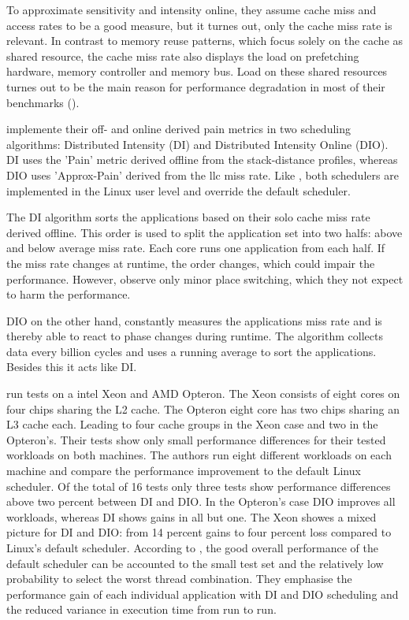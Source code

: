 To approximate sensitivity and intensity online, they assume cache miss and
access rates to be a good measure, but it turnes out, only the cache miss
rate is relevant.
In contrast to memory reuse patterns, which focus solely on the cache as shared
resource, the cache miss rate also displays the load on prefetching hardware,
memory controller and memory bus.
Load on these shared resources turnes out to be the main reason for performance
degradation in most of their benchmarks (\cite{zhuravlev_addressing_2010}).

\citeauthor{zhuravlev_addressing_2010} implemente their off- and online
derived pain metrics in two scheduling algorithms: Distributed Intensity (DI)
and Distributed Intensity Online (DIO).
DI uses the 'Pain' metric derived offline from the stack-distance profiles,
whereas DIO uses 'Approx-Pain' derived from the \gls{llc} miss rate.
Like \cite{banikazemi_pam_2008}, both schedulers are implemented in the
Linux user level and override the default scheduler.

The DI algorithm sorts the applications based on their solo cache miss rate derived
offline.
This order is used to split the application set into two halfs: above and below
average miss rate.
Each core runs one application from each half.
If the miss rate changes at runtime, the order changes, which could impair
the performance.
However, \citeauthor{zhuravlev_addressing_2010} observe only minor place
switching, which they not expect to harm the performance.

DIO on the other hand, constantly measures the applications miss rate and is
thereby able to react to phase changes during runtime.
The algorithm collects data every billion cycles and uses a running average to
sort the applications.
Besides this it acts like DI.

\citeauthor{zhuravlev_addressing_2010} run tests on a \gls{intel}
Xeon and AMD Opteron.
The Xeon consists of eight cores on four chips sharing the L2 cache.
The Opteron eight core has two chips sharing an L3 cache each.
Leading to four cache groups in the Xeon case and two in the Opteron's.
Their tests show only small performance differences for their tested workloads
on both machines.
The authors run eight different workloads on each machine and compare the
performance improvement to the default Linux scheduler.
Of the total of 16 tests only three tests show performance differences above
two percent between DI and DIO.
In the Opteron's case DIO improves all workloads, whereas DI shows gains in
all but one.
The Xeon showes a mixed picture for DI and DIO: from 14 percent gains to four
percent loss compared to Linux's default scheduler.
According to \citeauthor{zhuravlev_addressing_2010}, the good overall
performance of the default scheduler can be accounted to the small test set and
the relatively low probability to select the worst thread combination.
They emphasise the performance gain of each individual application with DI and
DIO scheduling and the reduced variance in execution time from run to run.

